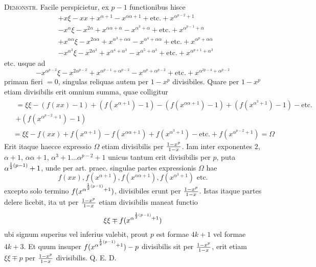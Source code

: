 \documentclass[twoside,12pt]{memoir}
\let\oldfrac\frac
\def\frac#1#2{\mathchoice{\tfrac{#1}{#2}}{\oldfrac{#1}{#2}}{\genfrac{}{}{}{2}{#1}{#2\mathstrut}}{\genfrac{}{}{}{3}{#1}{#2\mathstrut}}}
\begin{document}
\textsc{Demonstr.} Facile perspicietur, ex \(p-1\) functionibus hisce
\[\begin{aligned}
& +x \xi-x x+x^{\alpha+1}-x^{\alpha \alpha+1}+\text{etc.}+x^{\alpha^{p-2}+1} \\
& -x^{\alpha} \xi-x^{2 \alpha}+x^{\alpha \alpha+\alpha}-x^{\alpha^{3}+\alpha}+\text{etc.}+x^{\alpha^{p-1}+\alpha} \\
& +x^{\alpha \alpha} \xi-x^{2 \alpha \alpha}+x^{\alpha^{3}+\alpha \alpha}-x^{\alpha^{4}+\alpha \alpha}+\text{etc.}+x^{\alpha^{p}+\alpha \alpha} \\
& -x^{\alpha^{3}} \xi-x^{2 \alpha^{3}}+x^{\alpha^{4}+\alpha^{3}}-x^{\alpha^{5}+\alpha^{3}}+\text{etc.}+x^{\alpha^{p+1}+\alpha^{3}}
\end{aligned}\]
etc. usque ad
\[-x^{\alpha^{p-2}} \xi-x^{2 \alpha^{p-2}}+x^{\alpha^{p-1}+\alpha^{p-2}}-x^{\alpha^{p}+\alpha^{p-2}}+\text{etc.}+x^{\alpha^{2 p-4}+\alpha^{p-2}}\]
primam fieri \(=0\), singulas reliquas autem per \(1-x^{p}\) divisibiles. Quare per \(1-x^{p}\) etiam divisibilis erit omnium summa, quae colligitur
\[\begin{aligned}
&\begin{gathered}=\xi \xi-(f(x x)-1)+(f(x^{\alpha+1})-1)-(f(x^{\alpha \alpha+1})-1)+(f(x^{\alpha^{3}+1})-1)-\text{etc.}\\
+(f(x^{\alpha^{p-2}+1})-1) \end{gathered}\\
&=\xi \xi-f(x x)+f(x^{\alpha+1})-f(x^{\alpha \alpha+1})+f(x^{\alpha^{3}+1})-\text{etc.}+f(x^{\alpha^{p-2}+1})=\Omega
\end{aligned}\]
Erit itaque haecce expressio \(\Omega\) etiam divisibilis per \(\frac{1-x^{p}}{1-x}\). Iam inter exponentes \(2\), \(\alpha+1\), \(\alpha \alpha+1\), \(\alpha^{3}+1 \ldots \alpha^{p-2}+1\) unicus tantum erit divisibilis per \(p\), puta \(\alpha^{\frac{1}{2}(p-1)}+1\), unde per art. praec. singulae partes expressionis \(\Omega\) hae
\[f(x x), f(x^{\alpha+1}), f(x^{\alpha \alpha+1}), f(x^{\alpha^{3}+1}) \text{ etc.}\]
excepto solo termino \(f(x^{\alpha^{\frac{1}{2}(p-1)}+1})\), divisibiles erunt per \(\frac{1-x^{p}}{1-x}\). Istas itaque partes delere licebit, ita ut per \(\frac{1-x^{p}}{1-x}\) etiam divisibilis maneat functio
\[\xi \xi \mp f(x^{\alpha^{\frac{1}{2}(p-1)}+1})\]\pagebreak%
ubi signum superius vel inferius valebit, prout \(p\) est formae \(4 k+1\) vel formae \(4 k+3\). Et quum insuper \(f(x^{\alpha^{\frac{1}{2}(p-1)}+1})-p\) divisibilis sit per \(\frac{1-x^{p}}{1-x}\), erit etiam \(\xi \xi \mp p\) per \(\frac{1-x^{p}}{1-x}\) divisibilis. Q. E. D.
 
\end{document}
